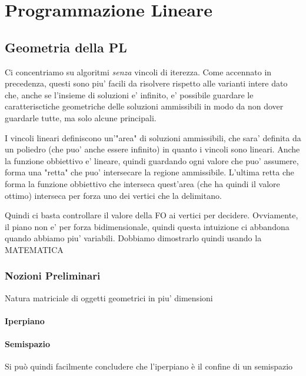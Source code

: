 % 
\chapter{Programmazione Lineare}
\section{Geometria della PL}
Ci concentriamo su algoritmi \textit{senza} vincoli di iterezza. Come accennato in precedenza, questi sono piu' facili da risolvere rispetto alle varianti intere dato che, anche se l'insieme di soluzioni e' infinito, e' possibile guardare le caratterisctiche geometriche delle soluzioni ammissibili in modo da non dover guardarle tutte, ma solo alcune principali.

I vincoli lineari definiscono un'"area" di soluzioni ammissibili, che sara' definita da un poliedro (che puo' anche essere infinito) in quanto i vincoli sono lineari. Anche la funzione obbiettivo e' lineare, quindi guardando ogni valore che puo' assumere, forma una "retta" che puo' intersecare la regione ammissibile. L'ultima retta che forma la funzione obbiettivo che interseca quest'area (che ha quindi il valore ottimo) interseca per forza uno dei vertici che la delimitano.

Quindi ci basta controllare il valore della FO ai vertici per decidere. Ovviamente, il piano non e' per forza bidimensionale, quindi questa intuizione ci abbandona quando abbiamo piu' variabili. Dobbiamo dimostrarlo quindi usando la MATEMATICA

\subsection{Nozioni Preliminari}
Natura matriciale di oggetti geometrici in piu' dimensioni

  \subsubsection{Iperpiano}

  \subsubsection{Semispazio}
  Si può quindi facilmente concludere che l'iperpiano è il confine di un semispazio

